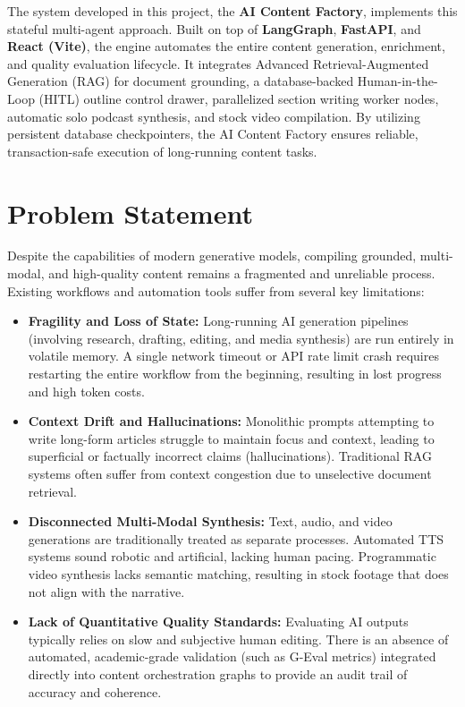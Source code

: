 The system developed in this project, the \textbf{AI Content Factory}, implements this stateful multi-agent approach. Built on top of \textbf{LangGraph}, \textbf{FastAPI}, and \textbf{React (Vite)}, the engine automates the entire content generation, enrichment, and quality evaluation lifecycle. It integrates Advanced Retrieval-Augmented Generation (RAG) for document grounding, a database-backed Human-in-the-Loop (HITL) outline control drawer, parallelized section writing worker nodes, automatic solo podcast synthesis, and stock video compilation. By utilizing persistent database checkpointers, the AI Content Factory ensures reliable, transaction-safe execution of long-running content tasks.

\section{Problem Statement}

Despite the capabilities of modern generative models, compiling grounded, multi-modal, and high-quality content remains a fragmented and unreliable process. Existing workflows and automation tools suffer from several key limitations:

\begin{itemize}
    \item \textbf{Fragility and Loss of State:} Long-running AI generation pipelines (involving research, drafting, editing, and media synthesis) are run entirely in volatile memory. A single network timeout or API rate limit crash requires restarting the entire workflow from the beginning, resulting in lost progress and high token costs.
    \item \textbf{Context Drift and Hallucinations:} Monolithic prompts attempting to write long-form articles struggle to maintain focus and context, leading to superficial or factually incorrect claims (hallucinations). Traditional RAG systems often suffer from context congestion due to unselective document retrieval.
    \item \textbf{Disconnected Multi-Modal Synthesis:} Text, audio, and video generations are traditionally treated as separate processes. Automated TTS systems sound robotic and artificial, lacking human pacing. Programmatic video synthesis lacks semantic matching, resulting in stock footage that does not align with the narrative.
    \item \textbf{Lack of Quantitative Quality Standards:} Evaluating AI outputs typically relies on slow and subjective human editing. There is an absence of automated, academic-grade validation (such as G-Eval metrics) integrated directly into content orchestration graphs to provide an audit trail of accuracy and coherence.
\end{itemize}

